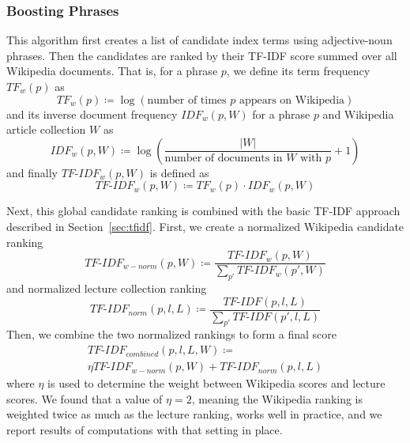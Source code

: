 \subsubsection{Boosting Phrases}

This algorithm first creates a list of candidate index terms using adjective-noun phrases. Then the candidates are ranked by their TF-IDF score summed over all Wikipedia documents. That is, for a phrase $p$, we define its term frequency $TF_w(p)$ as
\begin{equation*}
TF_w(p) \coloneqq \log\left(\text{number of times } p \text{ appears on Wikipedia}\right)
\end{equation*}
and its inverse document frequency $IDF_w(p, W)$ for a phrase $p$ and Wikipedia article collection $W$ as
\begin{equation*}
IDF_w(p, W) \coloneqq \log\left(\frac{|W|}{\text{number of documents in } W \text{ with } p} + 1\right)
\end{equation*}
and finally $TF\text{-}IDF_w(p, W)$ is defined as
\begin{equation*}
TF\text{-}IDF_w(p, W) \coloneqq TF_w(p) \cdot IDF_w(p, W)
\end{equation*}

Next, this global candidate ranking is combined with the basic TF-IDF approach described in Section~\ref{sec:tfidf}. First, we create a normalized Wikipedia candidate ranking
\begin{equation*}
TF\text{-}IDF_{w-norm}(p, W) \coloneqq \frac{TF\text{-}IDF_w(p, W)}{\sum_{p'} TF\text{-}IDF_w(p', W)}
\end{equation*}
and normalized lecture collection ranking
\begin{equation*}
TF\text{-}IDF_{norm}(p, l, L) \coloneqq \frac{TF\text{-}IDF(p, l, L)}{\sum_{p'} TF\text{-}IDF(p', l, L)}
\end{equation*}
Then, we combine the two normalized rankings to form a final score
\begin{multline*}
TF\text{-}IDF_{combined}(p, l, L, W) \coloneqq \\ \eta TF\text{-}IDF_{w-norm}(p, W) + TF\text{-}IDF_{norm}(p, l, L)
\end{multline*}
where $\eta$ is used to determine the weight between Wikipedia scores
and lecture scores. We found that a value of $\eta = 2$, meaning the
Wikipedia ranking is weighted twice as much as the lecture ranking,
works well in practice, and we report results of computations with
that setting in place.

